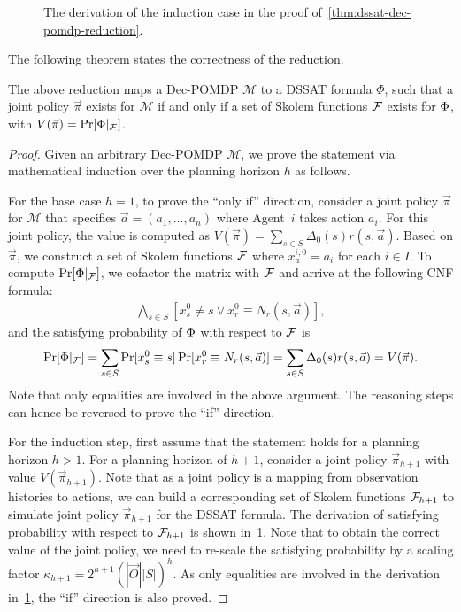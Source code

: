 \begin{figure}[t]
    \centering
    
    \caption{The derivation of the induction case in the proof of~\cref{thm:dssat-dec-pomdp-reduction}.}
    \label{fig:dssat-dec-pomdp-derivation}
\end{figure}

The following theorem states the correctness of the reduction.
\begin{theorem}\label{thm:dssat-dec-pomdp-reduction}
    The above reduction maps a Dec-POMDP $\mathcal{M}$ to a DSSAT formula $\Phi$,
    such that a joint policy $\vec{\pi}$ exists for $\mathcal{M}$ if and only if
    a set of Skolem functions $\mathcal{F}$ exists for $\Phi$, with $V(\vec{\pi})=\Pr[\Phi|_{\mathcal{F}}]$.
\end{theorem}
\begin{proof}
    Given an arbitrary Dec-POMDP $\mathcal{M}$,
    we prove the statement via mathematical induction over the planning horizon $h$ as follows.

    For the base case $h=1$,
    to prove the ``only if'' direction,
    consider a joint policy $\vec{\pi}$ for $\mathcal{M}$ that specifies $\vec{a}=(a_1,\ldots,a_n)$
    where Agent~$i$ takes action $a_i$.
    For this joint policy,
    the value is computed as $V(\vec{\pi})=\sum_{s \in S}\Delta_0(s)r(s,\vec{a})$.
    Based on $\vec{\pi}$,
    we construct a set of Skolem functions $\mathcal{F}$ where $x_a^{i,0}=a_i$ for each $i\in I$.
    To compute $\Pr[\Phi|_{\mathcal{F}}]$,
    we cofactor the matrix with $\mathcal{F}$ and arrive at the following CNF formula:
    \begin{align*}
        \bigwedge_{s\in S}[x_s^0\neq s \vee x_r^0 \equiv N_r(s,\vec{a})],
    \end{align*}
    and the satisfying probability of $\Phi$ with respect to $\mathcal{F}$ is
    \begin{align*}
        \Pr[\Phi|_{\mathcal{F}}]=
        \sum_{s\in S}\Pr[x_s^0 \equiv s]\Pr[x_r^0 \equiv N_r(s,\vec{a})]=
        \sum_{s\in S}\Delta_0(s)r(s,\vec{a})=V(\vec{\pi}).
    \end{align*}
    Note that only equalities are involved in the above argument.
    The reasoning steps can hence be reversed to prove the ``if'' direction.

    For the induction step,
    first assume that the statement holds for a planning horizon $h>1$.
    For a planning horizon of $h+1$,
    consider a joint policy $\vec{\pi}_{h+1}$ with value $V(\vec{\pi}_{h+1})$.
    Note that as a joint policy is a mapping from observation histories to actions,
    we can build a corresponding set of Skolem functions $\mathcal{F}_{h+1}$ to simulate joint policy $\vec{\pi}_{h+1}$ for the DSSAT formula.
    The derivation of satisfying probability with respect to $\mathcal{F}_{h+1}$ is shown in~\cref{fig:dssat-dec-pomdp-derivation}.
    Note that to obtain the correct value of the joint policy,
    we need to re-scale the satisfying probability by a scaling factor $\kappa_{h+1}=2^{h+1}(|\vec{O}||S|)^{h}$.
    As only equalities are involved in the derivation in~\cref{fig:dssat-dec-pomdp-derivation},
    the ``if'' direction is also proved.


\end{proof}
